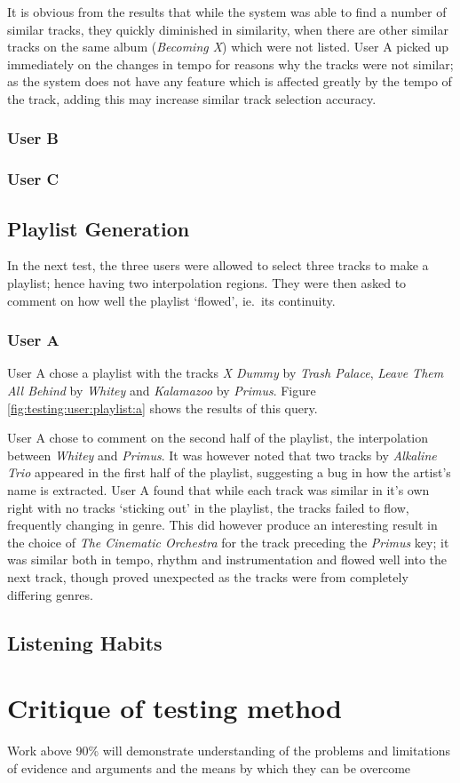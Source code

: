 It is obvious from the results that while the system was able to find a number of similar tracks, they quickly diminished in similarity, when there are other similar tracks on the same album (\emph{Becoming X}) which were not listed. User A picked up immediately on the changes in tempo for reasons why the tracks were not similar; as the system does not have any feature which is affected greatly by the tempo of the track, adding this may increase similar track selection accuracy.
\subsubsection{User B}
\subsubsection{User C}
\subsection{Playlist Generation}
In the next test, the three users were allowed to select three tracks to make a playlist; hence having two interpolation regions. They were then asked to comment on how well the playlist `flowed', ie.\ its continuity.
\subsubsection{User A}
User A chose a playlist with the tracks \emph{X Dummy} by \emph{Trash Palace}, \emph{Leave Them All Behind} by \emph{Whitey} and \emph{Kalamazoo} by \emph{Primus}. Figure \ref{fig:testing:user:playlist:a} shows the results of this query.

User A chose to comment on the second half of the playlist, the interpolation between \emph{Whitey} and \emph{Primus}. It was however noted that two tracks by \emph{Alkaline Trio} appeared in the first half of the playlist, suggesting a bug in how the artist's name is extracted. User A found that while each track was similar in it's own right with no tracks `sticking out' in the playlist, the tracks failed to flow, frequently changing in genre. This did however produce an interesting result in the choice of \emph{The Cinematic Orchestra} for the track preceding the \emph{Primus} key; it was similar both in tempo, rhythm and instrumentation and flowed well into the next track, though proved unexpected as the tracks were from completely differing genres.


\subsection{Listening Habits}

\section{Critique of testing method}
Work above 90\% will demonstrate understanding of the problems and limitations of evidence and arguments and the means by which they can be overcome
